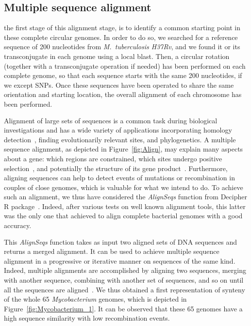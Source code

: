 \documentclass[runningheads,a4paper]{llncs}
\begin{document}

\subsection{Multiple sequence alignment}



the first stage of this alignment stage, is to identify a common starting point in these complete circular genomes. In order to do so, we searched for a reference sequence of 200 nucleotides from \textit{M.~tuberculosis H37Rv}, and we found it or its transconjugate in each genome using a local blast. Then, a circular rotation (together with a transconjugate operation if needed) has been performed on each complete genome, so that each sequence starts with the same 200 nucleotides, if we except SNPs. 
Once these sequences have been operated to share the same orientation and starting location, the overall alignment of each chromosome has been performed.

Alignment of large sets of sequences is a common task during biological investigations and has a wide variety of applications incorporating homology detection~\cite{wang2009procain}, finding evolutionarily relevant sites, and phylogenetics. A multiple sequence alignment, as depicted in Figure~\ref{fig:Align}, may explain many aspects about a gene: which regions are constrained, which sites undergo positive selection~\cite{kemena2009upcoming}, and potentially the structure of its gene product~\cite{warnow2013large}. Furthermore, aligning sequences can help to detect events of mutations or recombination in couples of close genomes, which is valuable for what we intend to do. To achieve such an alignment, we thus have considered the \textit{AlignSeqs} function from Decipher R package~\cite{team2013r}. Indeed, after various tests on well known alignment tools, this latter was the only one that achieved to align complete bacterial genomes with a good accuracy.

This \textit{AlignSeqs} function takes as input two aligned sets of DNA sequences and returns a merged alignment. It can be used to achieve multiple sequence alignment in a progressive or iterative manner on sequences of the same kind. Indeed, multiple alignments are accomplished by aligning two sequences, merging with another sequence, combining with another set of sequences, and so on until all the sequences are aligned~\cite{gentleman5840,wright2014art}. %
We thus obtained a first representation of synteny of the whole 65 \textit{Mycobacterium} genomes, which is depicted in Figure~\ref{fig:Mycobacterium_1}. 
It can be observed that these 65 genomes have a high sequence similarity with low recombination events.  
\end{document}
